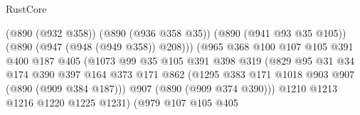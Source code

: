 \begin{lexlean}{RustCore}
\begin{coremodule}
                                          (@890 (@932 @358))
                                          (@890 (@936 @358 @35))
                                          (@890 (@941 @93 @35 @105))
                                          (@890 (@947 (@948 (@949 @358)) @208)))
                                        (@965
                                          @368
                                          @100
                                          @107
                                          @105
                                          @391
                                          @400
                                          @187
                                          @405
                                          (@1073
                                            @99
                                            @35
                                            @105
                                            @391
                                            @398
                                            @319
                                            (@829
                                              @95
                                              @31
                                              @34
                                              @174
                                              @390
                                              @397
                                              @164
                                              @373
                                              @171
                                              @862
                                              (@1295
                                                @383
                                                @171
                                                @1018
                                                @903
                                                @907
                                                (@890 (@909 @384 @187)))
                                              @907
                                              (@890 (@909 @374 @390)))
                                            @1210
                                            @1213
                                            @1216
                                            @1220
                                            @1225
                                            @1231)
                                          (@979
                                            @107
                                            @105
                                            @405

\end{coremodule}
\end{lexlean}

